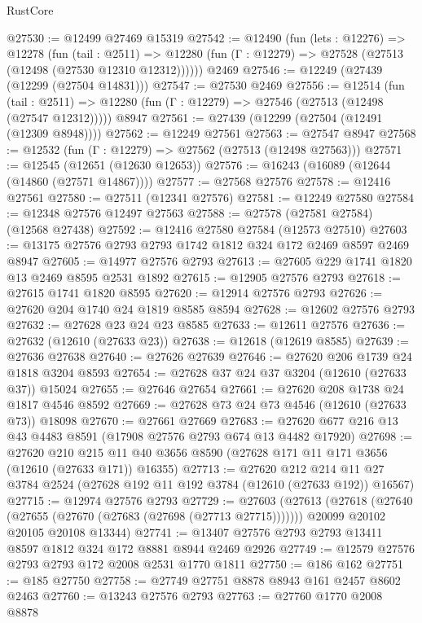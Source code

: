 \begin{lexlean}{RustCore}
\begin{coremodule}
@27530 := @12499 @27469 @15319
@27542 := @12490
    (fun (lets : @12276) =>
    @12278
      (fun (tail : @2511) =>
      @12280 (fun (Γ : @12279) => @27528 (@27513 (@12498 (@27530 @12310 @12312))))))
    @2469
@27546 := @12249 (@27439 (@12299 (@27504 @14831)))
@27547 := @27530 @2469
@27556 := @12514
    (fun (tail : @2511) => @12280 (fun (Γ : @12279) => @27546 (@27513 (@12498 (@27547 @12312)))))
    @8947
@27561 := @27439 (@12299 (@27504 (@12491 (@12309 @8948))))
@27562 := @12249 @27561
@27563 := @27547 @8947
@27568 := @12532 (fun (Γ : @12279) => @27562 (@27513 (@12498 @27563)))
@27571 := @12545 (@12651 (@12630 @12653))
@27576 := @16243 (@16089 (@12644 (@14860 (@27571 @14867))))
@27577 := @27568 @27576
@27578 := @12416 @27561
@27580 := @27511 (@12341 @27576)
@27581 := @12249 @27580
@27584 := @12348 @27576 @12497 @27563
@27588 := @27578 (@27581 @27584) (@12568 @27438)
@27592 := @12416 @27580 @27584 (@12573 @27510)
@27603 := @13175 @27576 @2793 @2793 @1742 @1812 @324 @172 @2469 @8597 @2469 @8947
@27605 := @14977 @27576 @2793
@27613 := @27605 @229 @1741 @1820 @13 @2469 @8595 @2531 @1892
@27615 := @12905 @27576 @2793
@27618 := @27615 @1741 @1820 @8595
@27620 := @12914 @27576 @2793
@27626 := @27620 @204 @1740 @24 @1819 @8585 @8594
@27628 := @12602 @27576 @2793
@27632 := @27628 @23 @24 @23 @8585
@27633 := @12611 @27576
@27636 := @27632 (@12610 (@27633 @23))
@27638 := @12618 (@12619 @8585)
@27639 := @27636 @27638
@27640 := @27626 @27639
@27646 := @27620 @206 @1739 @24 @1818 @3204 @8593
@27654 := @27628 @37 @24 @37 @3204 (@12610 (@27633 @37)) @15024
@27655 := @27646 @27654
@27661 := @27620 @208 @1738 @24 @1817 @4546 @8592
@27669 := @27628 @73 @24 @73 @4546 (@12610 (@27633 @73)) @18098
@27670 := @27661 @27669
@27683 := @27620 @677 @216 @13 @43 @4483 @8591 (@17908 @27576 @2793 @674 @13 @4482 @17920)
@27698 := @27620
    @210
    @215
    @11
    @40
    @3656
    @8590
    (@27628 @171 @11 @171 @3656 (@12610 (@27633 @171)) @16355)
@27713 := @27620
    @212
    @214
    @11
    @27
    @3784
    @2524
    (@27628 @192 @11 @192 @3784 (@12610 (@27633 @192)) @16567)
@27715 := @12974 @27576 @2793
@27729 := @27603
    (@27613
      (@27618 (@27640 (@27655 (@27670 (@27683 (@27698 (@27713 @27715)))))))
      @20099
      @20102
      @20105
      @20108
      @13344)
@27741 := @13407 @27576 @2793 @2793 @13411 @8597 @1812 @324 @172 @8881 @8944 @2469 @2926
@27749 := @12579 @27576 @2793 @2793 @172 @2008 @2531 @1770 @1811
@27750 := @186 @162
@27751 := @185 @27750
@27758 := @27749 @27751 @8878 @8943 @161 @2457 @8602 @2463
@27760 := @13243 @27576 @2793
@27763 := @27760 @1770 @2008 @8878

\end{coremodule}
\end{lexlean}
